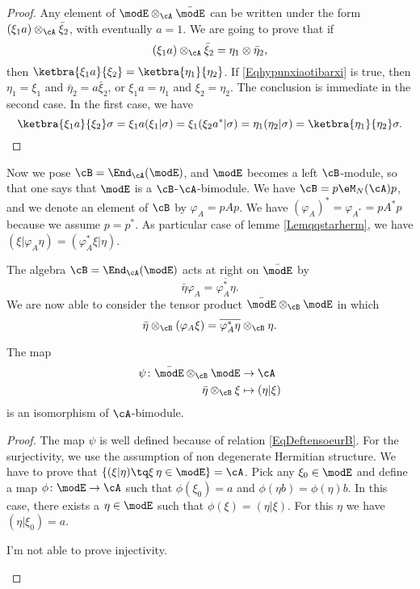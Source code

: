 \begin{proof}
Any element of $\modE\otimes_{\cA}\bar\modE$ can be written under the form $(\xi_1 a)\otimes_{\cA}\bar\xi_2$, with eventually $a=1$. We are going to prove that if 
\begin{equation}		\label{Eqhypunxiaotibarxi}
(\xi_1 a)\otimes_{\cA}\bar\xi_2=\eta_1\otimes\bar\eta_2,
\end{equation}
 then $\ketbra{\xi_1 a}{\xi_2} =\ketbra{\eta_1}{\eta_2} $. If \eqref{Eqhypunxiaotibarxi} is true, then $\eta_1=\xi_1$ and $\bar\eta_2=a\bar\xi_2$, or $\xi_1a=\eta_1$ and $\xi_2=\eta_2$. The conclusion is immediate in the second case. In the first case, we have
\[  
  \ketbra{\xi_1 a}{\xi_2} \sigma=\xi_1 a( \xi_1 | \sigma) =\xi_1( \xi_2 a^* | \sigma) =\eta_1( \eta_2 | \sigma) =\ketbra{\eta_1}{\eta_2} \sigma.
\]
\end{proof}

Now we pose $\cB=\End_{\cA}(\modE)$, and $\modE$ becomes a left $\cB$-module, so that one says that $\modE$ is a $\cB$-$\cA$-bimodule. We have $\cB=p\eM_N(\cA)p$, and we denote an element of $\cB$ by $\varphi_A=pAp$. We have $(\varphi_A)^*=\varphi_{A^*}=pA^*p$ because we assume $p=p^*$. As particular case of lemme \ref{Lemqqstarherm}, we have $( \xi | \varphi_A\eta) =( \varphi_A^*\xi | \eta) $.

The algebra $\cB=\End_{\cA}(\modE)$ acts at right on $\bar\modE$ by
\begin{equation}
	\bar\eta\varphi_A=\overline{ \varphi_A^*\eta }.
\end{equation}
We are now able to consider the tensor product $\bar\modE\otimes_{\cB}\modE$ in which
\begin{equation}		\label{EqDeftensoeurB}
	\bar\eta\otimes_{\cB}(\varphi_A\xi)=\overline{ \varphi_A^*\eta }\otimes_{\cB}\eta.
\end{equation}
\begin{proposition}
The map
\begin{equation}
\begin{aligned}
 \psi\colon \bar\modE\otimes_{\cB}\modE&\to \cA \\ 
   \bar\eta\otimes_{\cB}\xi&\mapsto ( \eta | \xi)  
\end{aligned}
\end{equation}
is an isomorphism of $\cA$-bimodule.
\end{proposition}

\begin{proof}
The map $\psi$ is well defined because of relation \eqref{EqDeftensoeurB}. For the surjectivity, we use the assumption of non degenerate Hermitian structure. We have to prove that $\{ ( \xi | \eta) \tq \xi\, \eta\in\modE  \}=\cA$. Pick any $\xi_0\in\modE$ and define a map $\phi\colon \modE\to \cA$ such that $\phi(\xi_0)=a$ and $\phi(\eta b)=\phi(\eta)b$. In this case, there exists a $\eta\in\modE$ such that $\phi(\xi)=( \eta | \xi) $. For this $\eta$ we have $( \eta | \xi_0)=a$.

\begin{probleme}
	I'm not able to prove injectivity.
\end{probleme}

\end{proof}


